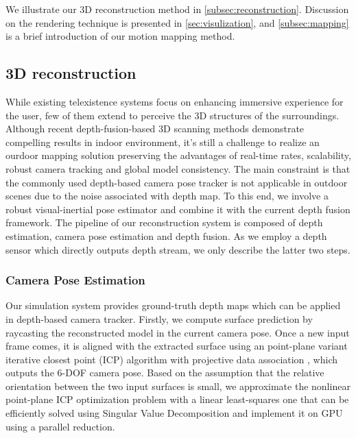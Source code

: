 \documentclass[journal]{IEEEtran}
\begin{document}
We illustrate our 3D reconstruction method in \autoref{subsec:reconstruction}.
Discussion on the rendering technique is presented in \autoref{sec:visulization},
and \autoref{subsec:mapping} is a brief introduction of our motion mapping method.

\subsection{3D reconstruction}
\label{subsec:reconstruction}
While existing telexistence systems focus on enhancing immersive experience for the user, 
few of them extend to perceive the 3D structures of the surroundings. 
Although recent depth-fusion-based 3D scanning methods demonstrate compelling results 
in indoor environment, it's still a challenge to realize an ourdoor mapping 
solution preserving the advantages of real-time rates, scalability, robust 
camera tracking and global model consistency.
The main constraint is that the commonly used depth-based camera pose tracker 
is not applicable in outdoor scenes due to the noise associated with depth 
map. To this end, we involve a robust visual-inertial pose estimator and combine it 
with the current depth fusion framework. The pipeline of our reconstruction system is 
composed of depth estimation, camera pose estimation and depth fusion. As we employ a 
depth sensor which directly outputs depth stream, we only describe the latter two 
steps.



\subsubsection{Camera Pose Estimation}
Our simulation system provides ground-truth depth maps which can be 
applied in depth-based camera tracker. Firstly, we compute surface prediction 
by raycasting the reconstructed model in the current camera pose.
Once a new input frame comes, it is aligned with the extracted surface 
using an point-plane variant iterative closest point (ICP) algorithm with 
projective data association \cite{CHEN1992145}, which outputs the 6-DOF camera pose.
Based on the assumption that the relative orientation between the two input surfaces 
is small, we approximate the nonlinear point-plane ICP optimization problem with a 
linear least-squares one that can be efficiently solved using Singular Value 
Decomposition \cite{article} and implement it on GPU using a parallel reduction.
\end{document}
